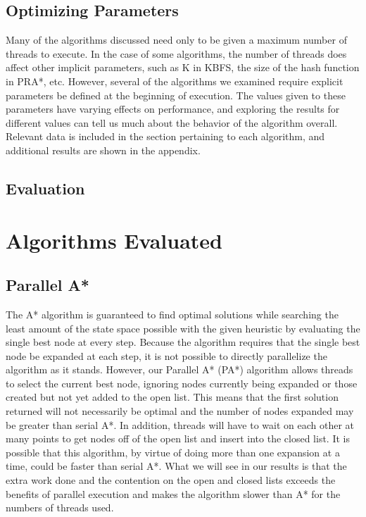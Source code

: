 \documentclass{article}
\begin{document}
\subsection{Optimizing Parameters}
Many of the algorithms discussed need only to be given a maximum number of threads to execute. In the case of some algorithms, the number of threads does affect other implicit parameters, such as K in KBFS, the size of the hash function in PRA*, etc. However, several of the algorithms we examined require explicit parameters be defined at the beginning of execution. The values given to these parameters have varying effects on performance, and exploring the results for different values can tell us much about the behavior of the algorithm overall. Relevant data is included in the section pertaining to each algorithm, and additional results are shown in the appendix.
\subsection{Evaluation}
\section{Algorithms Evaluated}
\subsection{Parallel A*}
The A* algorithm \cite{hart:fbh} is guaranteed to find optimal solutions while searching the least amount of the state space possible with the given heuristic by evaluating the single best node at every step. Because the algorithm requires that the single best node be expanded at each step, it is not possible to directly parallelize the algorithm as it stands. However, our Parallel A* (PA*) algorithm allows threads to select the current best node, ignoring nodes currently being expanded or those created but not yet added to the open list. This means that the first solution returned will not necessarily be optimal and the number of nodes expanded may be greater than serial A*. In addition, threads will have to wait on each other at many points to get nodes off of the open list and insert into the closed list. It is possible that this algorithm, by virtue of doing more than one expansion at a time, could be faster than serial A*. What we will see in our results is that the extra work done and the contention on the open and closed lists exceeds the benefits of parallel execution and makes the algorithm slower than A* for the numbers of threads used.
\end{document}
